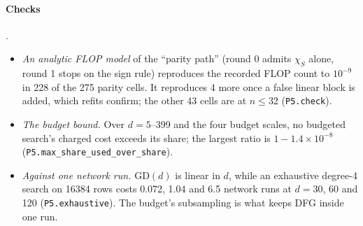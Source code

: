 \paragraph{Checks} .
\begin{itemize}
\item \emph{An analytic FLOP model} of the ``parity path'' (round 0 admits $\chi_S$ alone, round 1 stops on the sign rule) reproduces the recorded FLOP count to $10^{-9}$ in 228 of the 275 parity cells. It reproduces 4 more once a false linear block is added, which refits confirm; the other 43 cells are at $n\le32$ (\texttt{P5.check}).
\item \emph{The budget bound.} Over $d=5$--399 and the four budget scales, no budgeted search's charged cost exceeds its share; the largest ratio is $1-1.4\times10^{-8}$ (\texttt{P5.max\_share\_used\_over\_share}).
\item \emph{Against one network run.} $\mathrm{GD}(d)$ is linear in $d$, while an exhaustive degree-4 search on 16384 rows costs 0.072, 1.04 and 6.5 network runs at $d=30$, 60 and 120 (\texttt{P5.exhaustive}). The budget's subsampling is what keeps DFG inside one run.
\end{itemize}
